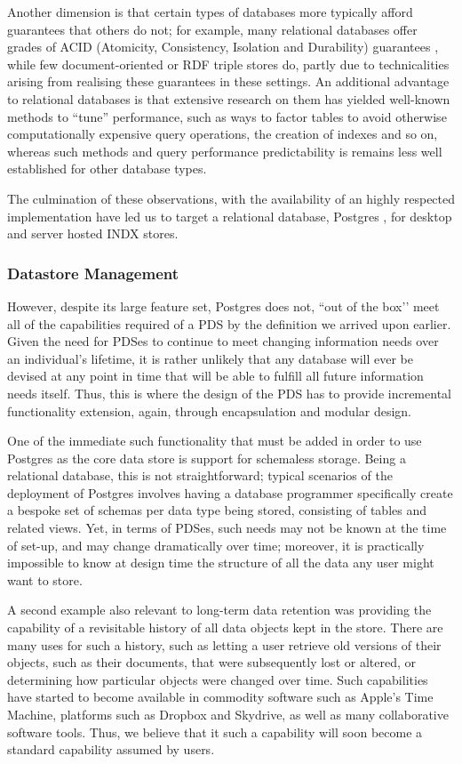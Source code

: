 \documentclass[graybox]{svmult}
\begin{document}
Another dimension is that certain types of databases more typically afford guarantees that others do not; for example, many relational databases offer grades of ACID (Atomicity, Consistency, Isolation and Durability) guarantees \cite{muth1991atomic}, while few document-oriented or RDF triple stores do, partly due to technicalities arising from realising these guarantees in these settings.  An additional advantage to relational databases is that extensive research on them has yielded well-known methods to “tune” performance, such as ways to factor tables to avoid otherwise computationally expensive query operations, the creation of indexes and so on, whereas such methods and query performance predictability is remains less well established for other database types.

The culmination of these observations, with the availability of an highly respected implementation have led us to target a relational database, Postgres \cite{stonebraker1986design}, for desktop and server hosted INDX stores.  

\subsubsection{Datastore Management}
However, despite its large feature set, Postgres does not, ``out of the box’’ meet all of the capabilities required of a PDS by the definition we arrived upon earlier.  Given the need for PDSes to continue to meet changing information needs over an individual’s lifetime, it is rather unlikely that any database will ever be devised at any point in time that will be able to fulfill all future information needs itself.  Thus, this is where the design of the PDS has to provide incremental functionality extension, again, through encapsulation and modular design.

One of the immediate such functionality that must be added in order to use Postgres as the core data store is support for schemaless storage.  Being a relational database, this is not straightforward; typical scenarios of the deployment of Postgres involves having a database programmer specifically create a bespoke set of schemas per data type being stored, consisting of tables and related views. Yet, in terms of PDSes, such needs may not be known at the time of set-up, and may change dramatically over time; moreover, it is practically impossible to know at design time the structure of all the data any user might want to store.

A second example also relevant to long-term data retention was providing the capability of a revisitable history of all data objects kept in the store.  There are many uses for such a history, such as letting a user retrieve old versions of their objects, such as their documents, that were subsequently lost or altered, or determining how particular objects were changed over time.  Such capabilities have started to become available in commodity software such as Apple’s Time Machine, platforms such as Dropbox and Skydrive, as well as many collaborative software tools.  Thus, we believe that it such a capability will soon become a standard capability assumed by users.
\end{document}
